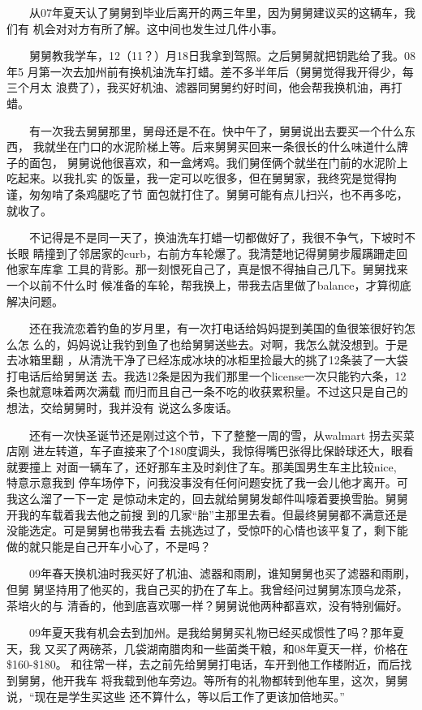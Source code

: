 \documentclass[12pt]{book}
\begin{document}
　　从07年夏天认了舅舅到毕业后离开的两三年里，因为舅舅建议买的这辆车，我们有
机会对对方有所了解。这中间也发生过几件小事。

　　舅舅教我学车，12（11？）月18日我拿到驾照。之后舅舅就把钥匙给了我。08年5
月第一次去加州前有换机油洗车打蜡。差不多半年后（舅舅觉得我开得少，每三个月太
浪费了），我买好机油、滤器同舅舅约好时间，他会帮我换机油，再打蜡。

　　有一次我去舅舅那里，舅母还是不在。快中午了，舅舅说出去要买一个什么东西，
我就坐在门口的水泥阶梯上等。后来舅舅买回来一条很长的什么味道什么牌子的面包，
舅舅说他很喜欢，和一盒烤鸡。我们舅侄俩个就坐在门前的水泥阶上吃起来。以我扎实
的饭量，我一定可以吃很多，但在舅舅家，我终究是觉得拘谨，匆匆啃了条鸡腿吃了节
面包就打住了。舅舅可能有点儿扫兴，也不再多吃，就收了。

　　不记得是不是同一天了，换油洗车打蜡一切都做好了，我很不争气，下坡时不长眼
睛撞到了邻居家的curb，右前方车轮爆了。我清楚地记得舅舅步履蹒跚走回他家车库拿
工具的背影。那一刻恨死自己了，真是恨不得抽自己几下。舅舅找来一个以前不什么时
候准备的车轮，帮我换上，带我去店里做了balance，才算彻底解决问题。

　　还在我流恋着钓鱼的岁月里，有一次打电话给妈妈提到美国的鱼很笨很好钓怎么怎
么的，妈妈说让我钓到鱼了也给舅舅送些去。对啊，我怎么就没想到。于是去冰箱里翻
，从清洗干净了已经冻成冰块的冰柜里捡最大的挑了12条装了一大袋打电话后给舅舅送
去。我选12条是因为我们那里一个license一次只能钓六条，12条也就意味着两次满载
而归而且自己一条不吃的收获累积量。不过这只是自己的想法，交给舅舅时，我并没有
说这么多废话。

　　还有一次快圣诞节还是刚过这个节，下了整整一周的雪，从walmart 拐去买菜店刚
进左转道，车子直接来了个180度调头，我惊得嘴巴张得比保龄球还大，眼看就要撞上
对面一辆车了，还好那车主及时刹住了车。那美国男生车主比较nice,　特意示意我到
停车场停下，问我没事没有任何问题安抚了我一会儿他才离开。可我这么溜了一下一定
是惊动未定的，回去就给舅舅发邮件叫嚎着要换雪胎。舅舅开我的车载着我去他之前搜
到的几家“胎”主那里去看。但最终舅舅都不满意还是没能选定。可是舅舅也带我去看
去挑选过了，受惊吓的心情也该平复了，剩下能做的就只能是自己开车小心了，不是吗？

　　09年春天换机油时我买好了机油、滤器和雨刷，谁知舅舅也买了滤器和雨刷，但舅
舅坚持用了他买的，我自己买的扔在了车上。我曾经问过舅舅冻顶乌龙茶，茶培火的与
清香的，他到底喜欢哪一样？舅舅说他两种都喜欢，没有特别偏好。

　　09年夏天我有机会去到加州。是我给舅舅买礼物已经买成惯性了吗？那年夏天，我
又买了两磅茶，几袋湖南腊肉和一些菌类干粮，和08年夏天一样，价格在\$160-\$180。
和往常一样，去之前先给舅舅打电话，车开到他工作楼附近，而后找到舅舅，他开我车
将我载到他车旁边。等所有的礼物都转到他车里，这次，舅舅说，“现在是学生买这些
还不算什么，等以后工作了更该加倍地买。”
\end{document}
